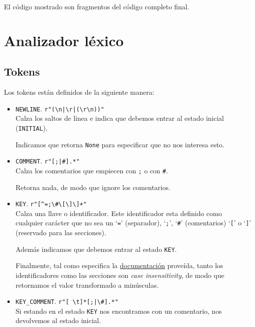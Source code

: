\documentclass[spanish, fleqn]{article}
\begin{document}
El código mostrado son fragmentos del código completo final.

\section{Analizador léxico}

\subsection{Tokens}
Los tokens están definidos de la siguiente manera:
\begin{itemize}
    \item \texttt{NEWLINE}. \texttt{r"(\textbackslash n|\textbackslash r|(\textbackslash r\textbackslash n))"} \\ Calza los saltos de linea e indica que debemos entrar al estado inicial (\texttt{INITIAL}).
    
    Indicamos que retorna \texttt{None} para especificar que no nos interesa esto.
    
    \item \texttt{COMMENT}. \texttt{r"[;|\#].*"} \\ Calza los comentarios que empiecen con \texttt{;} o con \texttt{\#}. 
    
    Retorna nada, de modo que ignore los comentarios.
    
    \item \texttt{KEY}. \texttt{r"[\textasciicircum=;\textbackslash \#\textbackslash[\textbackslash]\textbackslash]+"} \\ Calza una llave o identificador. Este identificador esta definido como cualquier carácter que no sea un `\texttt{=}' (separador), `\texttt{;}', `\texttt{\#}' (comentarios) `\texttt{[}' o `\texttt{]}' (reservado para las secciones). 
    
    Además indicamos que debemos entrar al estado \texttt{KEY}. 
    
    Finalmente, tal como especifica la \href{http://portablecontacts.net/wiki/computing/ini-file}{documentación} proveída, tanto los identificadores como las secciones son \textit{case insensitivity}, de modo que retornamos el valor transformado a minúsculas.
    
    \item \texttt{KEY\_COMMENT}. \texttt{r"[ \textbackslash t]*[;|\textbackslash\#].*"} \\ Si estando en el estado \texttt{KEY} nos encontramos con un comentario, nos devolvemos al estado inicial.
    

\end{itemize}
\end{document}
